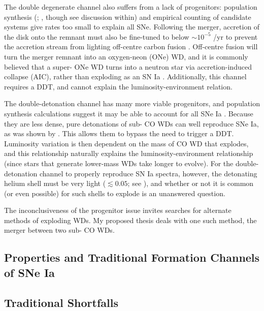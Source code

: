 The double degenerate {\Mch} channel also suffers from a lack of progenitors: population synthesis (\citealt{menn+10}; \citealt{ruitbf09}, though see discussion within) and empirical counting of candidate systems \citep{badem12} give rates too small to explain all SNe.  Following the merger, accretion of the disk onto the remnant must also be fine-tuned to below $\sim 10^{-5}$ {\Msun}/yr to prevent the accretion stream from lighting off-centre carbon fusion \citep{yoonpr07}.  Off-centre fusion will turn the merger remnant into an oxygen-neon (ONe) WD, and it is commonly believed that a super-{\Mch} ONe WD turns into a neutron star via accretion-induced collapse (AIC), rather than exploding as an SN Ia \citep{yoonpr07}.  Additionally, this channel requires a DDT, and cannot explain the luminosity-environment relation.

The double-detonation channel has many more viable progenitors, and population synthesis calculations suggest it may be able to account for all SNe Ia \citep{ruit+11}.  Because they are less dense, pure detonations of sub-{\Mch} CO WDs can well reproduce SNe Ia, as was shown by \cite{sim+10}.  This allows them to bypass the need to trigger a DDT.  Luminosity variation is then dependent on the mass of CO WD that explodes, and this relationship naturally explains the luminosity-environment relationship (since stars that generate lower-mass WDs take longer to evolve).  For the double-detonation channel to properly reproduce SN Ia spectra, however, the detonating helium shell must be very light ($\lesssim 0.05${\Msun}; see \citealt{woosk11}), and whether or not it is common (or even possible) for such shells to explode is an unanswered question.

The inconclusiveness of the progenitor issue invites searches for alternate methods of exploding WDs.  My proposed thesis deals with one such method, the merger between two sub-{\Mch} CO WDs.


\subsection{Properties and Traditional Formation Channels of SNe Ia}
\label{ssec:old_typeia}

\subsection{Traditional Shortfalls}

